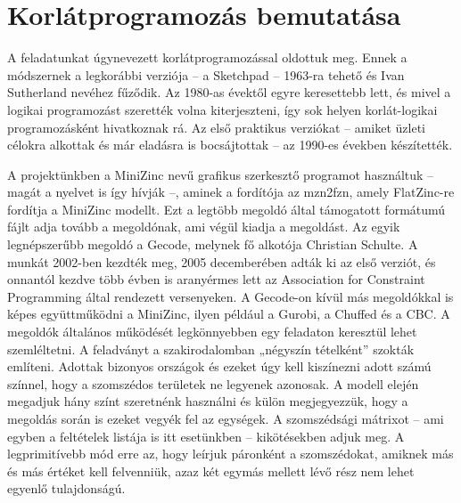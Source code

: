 \documentclass[12pt,a4paper,twoside, openright]{report}
\begin{document}
\section{Korlátprogramozás bemutatása} 

    A feladatunkat úgynevezett korlátprogramozással oldottuk meg.
    Ennek a módszernek a legkorábbi verziója – a Sketchpad – 1963-ra tehető és Ivan Sutherland nevéhez fűződik\cite{sketchpad}.
    Az 1980-as évektől egyre keresettebb lett, és mivel a logikai programozást szerették volna kiterjeszteni, így sok helyen korlát-logikai programozásként hivatkoznak rá.
    Az első praktikus verziókat – amiket üzleti célokra alkottak és már eladásra is bocsájtottak – az 1990-es években készítették.

    A projektünkben a MiniZinc nevű grafikus szerkesztő programot használtuk – magát a nyelvet is így hívják –, aminek a fordítója az mzn2fzn, amely FlatZinc-re fordítja a MiniZinc modellt.
    Ezt a legtöbb megoldó által támogatott formátumú fájlt adja tovább a megoldónak, ami végül kiadja a megoldást.
    Az egyik legnépszerűbb megoldó a Gecode, melynek fő alkotója Christian Schulte\cite{gecode}.
    A munkát 2002-ben kezdték meg, 2005 decemberében adták ki az első verziót, és onnantól kezdve több évben is aranyérmes lett az Association for Constraint Programming által rendezett versenyeken.
    A Gecode-on kívül más megoldókkal is képes együttműködni a MiniZinc, ilyen például a Gurobi, a Chuffed és a CBC.
    A megoldók általános működését legkönnyebben egy feladaton keresztül lehet szemléltetni.
    A feladványt a szakirodalomban „négyszín tételként” szokták említeni.
    Adottak bizonyos országok és ezeket úgy kell kiszínezni adott számú színnel, hogy a szomszédos területek ne legyenek azonosak.
    A modell elején megadjuk hány színt szeretnénk használni és külön megjegyezzük, hogy a megoldás során is ezeket vegyék fel az egységek.
    A szomszédsági mátrixot – ami egyben a feltételek listája is itt esetünkben – kikötésekben adjuk meg.
    A legprimitívebb mód erre az, hogy leírjuk páronként a szomszédokat, amiknek más és más értéket kell felvenniük, azaz két egymás mellett lévő rész nem lehet egyenlő tulajdonságú.

\end{document}
